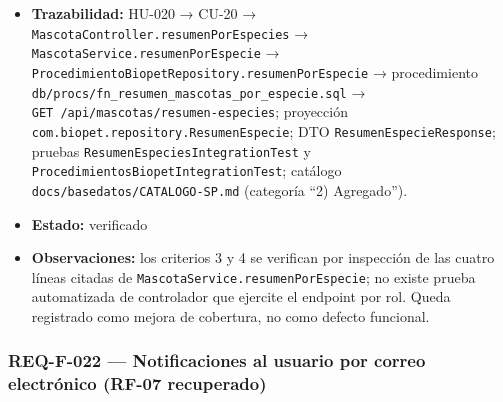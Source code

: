 \documentclass[
  spanish,
]{article}
\begin{document}
\begin{itemize}
  Criterio 5: \texttt{docs/\allowbreak{}basedatos/\allowbreak{}CATALOGO-\allowbreak{}SP.\allowbreak{}md} y
  \texttt{scripts/\allowbreak{}audit-\allowbreak{}sql-\allowbreak{}dynamic.\allowbreak{}sh} (ver REQ-NF-013).
\item
  \textbf{Trazabilidad:} HU-020 → CU-20 →
  \texttt{Mascota\allowbreak{}Controller.\allowbreak{}resumen\allowbreak{}Por\allowbreak{}Especies} →
  \texttt{Mascota\allowbreak{}Service.\allowbreak{}resumen\allowbreak{}Por\allowbreak{}Especie} →
  \texttt{Procedimiento\allowbreak{}Biopet\allowbreak{}Repository.\allowbreak{}resumen\allowbreak{}Por\allowbreak{}Especie} →
  procedimiento
  \texttt{db/\allowbreak{}procs/\allowbreak{}fn\_\allowbreak{}resumen\_\allowbreak{}mascota\allowbreak{}s\_\allowbreak{}por\_\allowbreak{}especie.\allowbreak{}sql} →
  \texttt{GET\ /\allowbreak{}api/\allowbreak{}mascotas/\allowbreak{}resumen-\allowbreak{}especies}; proyección
  \texttt{com.\allowbreak{}biopet.\allowbreak{}repository.\allowbreak{}Resumen\allowbreak{}Especie}; DTO
  \texttt{Resumen\allowbreak{}Especie\allowbreak{}Response}; pruebas
  \texttt{Resumen\allowbreak{}Especies\allowbreak{}Integration\allowbreak{}Test} y
  \texttt{Procedimientos\allowbreak{}Biopet\allowbreak{}Integration\allowbreak{}Test}; catálogo
  \texttt{docs/\allowbreak{}basedatos/\allowbreak{}CATALOGO-\allowbreak{}SP.\allowbreak{}md} (categoría ``2) Agregado'').
\item
  \textbf{Estado:} verificado
\item
  \textbf{Observaciones:} los criterios 3 y 4 se verifican por
  inspección de las cuatro líneas citadas de
  \texttt{Mascota\allowbreak{}Service.\allowbreak{}resumen\allowbreak{}Por\allowbreak{}Especie}; no existe prueba
  automatizada de controlador que ejercite el endpoint por rol. Queda
  registrado como mejora de cobertura, no como defecto funcional.
\end{itemize}

\subsubsection{REQ-F-022 --- Notificaciones al usuario por correo
electrónico (RF-07
recuperado)}\label{req-f-022-notificaciones-al-usuario-por-correo-electruxf3nico-rf-07-recuperado}
\end{document}
